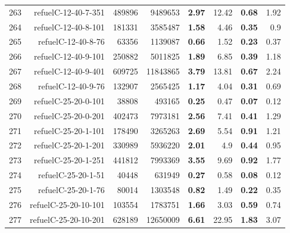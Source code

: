 \begin{longtable}{lrr@{\hskip 12pt}r@{\hskip 12pt}r@{\hskip 12pt}r@{\hskip 12pt}r@{\hskip 12pt}r}
263 & \multirow{1}{*}{refuelC-12-40-7-351} & \multirow{1}{*}{489896} & \multirow{1}{*}{9489653} & \textbf{2.97} & 12.42 & \textbf{0.68} & 1.92 \\
264 & \multirow{1}{*}{refuelC-12-40-8-101} & \multirow{1}{*}{181331} & \multirow{1}{*}{3585487} & \textbf{1.58} & 4.46 & \textbf{0.35} & 0.9 \\
265 & \multirow{1}{*}{refuelC-12-40-8-76} & \multirow{1}{*}{63356} & \multirow{1}{*}{1139087} & \textbf{0.66} & 1.52 & \textbf{0.23} & 0.37 \\
266 & \multirow{1}{*}{refuelC-12-40-9-101} & \multirow{1}{*}{250882} & \multirow{1}{*}{5011825} & \textbf{1.89} & 6.85 & \textbf{0.39} & 1.18 \\
267 & \multirow{1}{*}{refuelC-12-40-9-401} & \multirow{1}{*}{609725} & \multirow{1}{*}{11843865} & \textbf{3.79} & 13.81 & \textbf{0.67} & 2.24 \\
268 & \multirow{1}{*}{refuelC-12-40-9-76} & \multirow{1}{*}{132907} & \multirow{1}{*}{2565425} & \textbf{1.17} & 4.04 & \textbf{0.31} & 0.69 \\
269 & \multirow{1}{*}{refuelC-25-20-0-101} & \multirow{1}{*}{38808} & \multirow{1}{*}{493165} & \textbf{0.25} & 0.47 & \textbf{0.07} & 0.12 \\
270 & \multirow{1}{*}{refuelC-25-20-0-201} & \multirow{1}{*}{402473} & \multirow{1}{*}{7973181} & \textbf{2.56} & 7.41 & \textbf{0.41} & 1.29 \\
271 & \multirow{1}{*}{refuelC-25-20-1-101} & \multirow{1}{*}{178490} & \multirow{1}{*}{3265263} & \textbf{2.69} & 5.54 & \textbf{0.91} & 1.21 \\
272 & \multirow{1}{*}{refuelC-25-20-1-201} & \multirow{1}{*}{330989} & \multirow{1}{*}{5936220} & \textbf{2.01} & 4.9 & \textbf{0.44} & 0.95 \\
273 & \multirow{1}{*}{refuelC-25-20-1-251} & \multirow{1}{*}{441812} & \multirow{1}{*}{7993369} & \textbf{3.55} & 9.69 & \textbf{0.92} & 1.77 \\
274 & \multirow{1}{*}{refuelC-25-20-1-51} & \multirow{1}{*}{40448} & \multirow{1}{*}{631949} & \textbf{0.27} & 0.58 & \textbf{0.08} & 0.12 \\
275 & \multirow{1}{*}{refuelC-25-20-1-76} & \multirow{1}{*}{80014} & \multirow{1}{*}{1303548} & \textbf{0.82} & 1.49 & \textbf{0.22} & 0.35 \\
276 & \multirow{1}{*}{refuelC-25-20-10-101} & \multirow{1}{*}{103554} & \multirow{1}{*}{1783751} & \textbf{1.66} & 3.03 & \textbf{0.59} & 0.74 \\
277 & \multirow{1}{*}{refuelC-25-20-10-201} & \multirow{1}{*}{628189} & \multirow{1}{*}{12650009} & \textbf{6.61} & 22.95 & \textbf{1.83} & 3.07 \\

\end{longtable}
